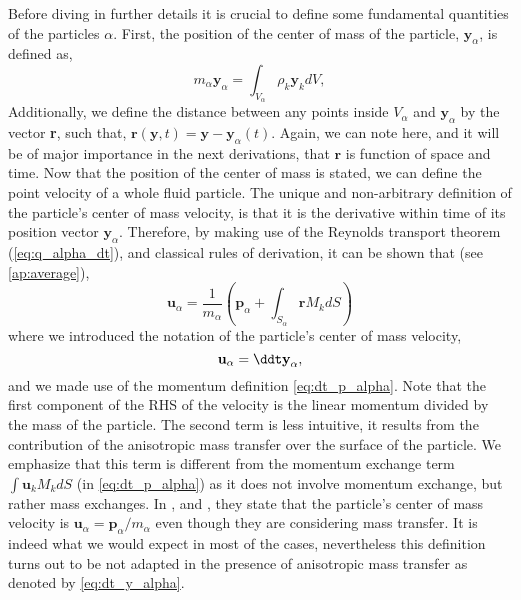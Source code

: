 Before diving in further details it is crucial to define some fundamental quantities of the particles $\alpha$. 
First, the position of the center of mass of the particle, $\textbf{y}_\alpha$, is defined as, 
\begin{equation*}
    m_\alpha \textbf{y}_\alpha
    = \int_{V_\alpha} \rho_k \textbf{y}_k dV,
\end{equation*}
Additionally, we define the distance between any points inside $V_\alpha$ and $\textbf{y}_\alpha$ by the vector \textbf{r}, such that, $\textbf{r}(\textbf{y},t) = \textbf{y} - \textbf{y}_\alpha(t)$.
Again, we can note here, and it will be of major importance in the next derivations, that $\textbf{r}$ is function of space and time. 
Now that the position of the center of mass is stated, we can define the point velocity of a whole fluid particle.
The unique and non-arbitrary definition of the particle's center of mass velocity, is that it is the derivative within time of its position vector $\textbf{y}_\alpha$.
Therefore, by making use of the Reynolds transport theorem (\ref{eq:q_alpha_dt}), and classical rules of derivation, it can be shown that (see \ref{ap:average}),  
\begin{equation}
    \textbf{u}_\alpha
    = \frac{1}{m_\alpha} \left(
        \textbf{p}_\alpha
        +  \int_{S_\alpha} \textbf{r} M_k dS
    \right)
    \label{eq:dt_y_alpha}
\end{equation}
where we introduced the notation of the particle's center of mass velocity, 
\begin{equation*}
    \textbf{u}_\alpha = \ddt \textbf{y}_\alpha,
\end{equation*}
and we made use of the momentum definition \ref{eq:dt_p_alpha}.
Note that the first component of the RHS of the velocity is the linear momentum divided by the mass of the particle.
The second term is less intuitive, it results from the contribution of the anisotropic mass transfer over the surface of the particle. 
We emphasize that this term is different from the momentum exchange term $\int \textbf{u}_kM_k dS$ (in \ref{eq:dt_p_alpha}) as it does not involve momentum exchange, but rather mass exchanges. 
In \citet{zaepffel2011modelisation}, \citet{paisant2014modelisation} and \citet{morel2015mathematical}, they state that the particle's center of mass velocity is $\textbf{u}_\alpha = \textbf{p}_\alpha / m_\alpha$ even though they are considering mass transfer. 
It is indeed what we would expect in most of the cases, nevertheless this definition turns out to be not adapted in the presence of anisotropic mass transfer as denoted by \ref{eq:dt_y_alpha}. 
